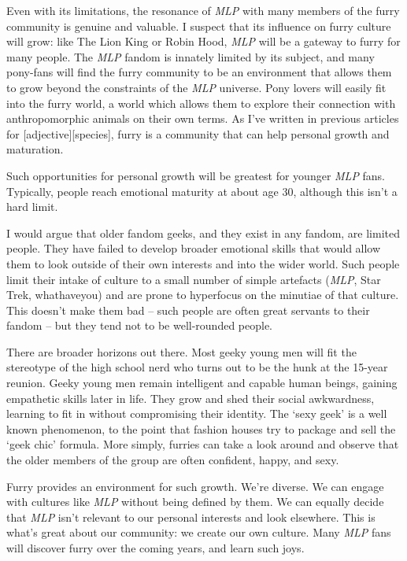 Even with its limitations, the resonance of \textit{MLP} with many members of the furry community is genuine and valuable. I suspect that its influence on furry culture will grow: like The Lion King or Robin Hood, \textit{MLP} will be a gateway to furry for many people. The \textit{MLP} fandom is innately limited by its subject, and many pony-fans will find the furry community to be an environment that allows them to grow beyond the constraints of the \textit{MLP} universe. Pony lovers will easily fit into the furry world, a world which allows them to explore their connection with anthropomorphic animals on their own terms. As I've written in previous articles for [adjective][species], furry is a community that can help personal growth and maturation.

Such opportunities for personal growth will be greatest for younger \textit{MLP} fans. Typically, people reach emotional maturity at about age 30, although this isn't a hard limit.

I would argue that older fandom geeks, and they exist in any fandom, are limited people. They have failed to develop broader emotional skills that would allow them to look outside of their own interests and into the wider world. Such people limit their intake of culture to a small number of simple artefacts (\textit{MLP}, Star Trek, whathaveyou) and are prone to hyperfocus on the minutiae of that culture. This doesn't make them bad -- such people are often great servants to their fandom -- but they tend not to be well-rounded people.

There are broader horizons out there. Most geeky young men will fit the stereotype of the high school nerd who turns out to be the hunk at the 15-year reunion. Geeky young men remain intelligent and capable human beings, gaining empathetic skills later in life. They grow and shed their social awkwardness, learning to fit in without compromising their identity. The `sexy geek' is a well known phenomenon, to the point that fashion houses try to package and sell the `geek chic' formula. More simply, furries can take a look around and observe that the older members of the group are often confident, happy, and sexy.

Furry provides an environment for such growth. We're diverse. We can engage with cultures like \textit{MLP} without being defined by them. We can equally decide that \textit{MLP} isn't relevant to our personal interests and look elsewhere. This is what's great about our community: we create our own culture. Many \textit{MLP} fans will discover furry over the coming years, and learn such joys.

